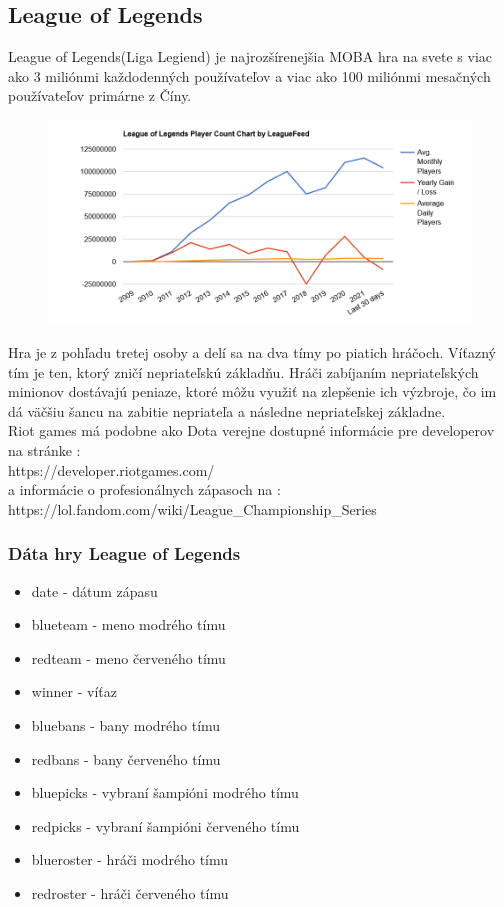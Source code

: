 \subsection{League of Legends}
League of Legends(Liga Legiend) je najrozšírenejšia MOBA hra na svete s viac ako 3 miliónmi každodenných používateľov a viac ako 100 miliónmi mesačných používateľov primárne z Číny. \cite{leaguefeed} 

 \begin{figure}[h!]
	
	\includegraphics[width=.9\textwidth]{figures/leaguegraph}
	\centering
	\caption{   \label{leaguegraph}}
	
\end{figure}

Hra je z pohľadu tretej osoby a delí sa na dva tímy po piatich hráčoch. Víťazný tím je ten, ktorý zničí nepriateľskú základňu. Hráči zabíjaním nepriateľských minionov dostávajú peniaze, ktoré môžu využiť na zlepšenie ich výzbroje, čo im dá väčšiu šancu na zabitie nepriateľa a následne nepriateľskej základne.
\\ 
Riot games má podobne ako Dota verejne dostupné informácie pre developerov na stránke : 
\\ 
https://developer.riotgames.com/  
\\
a informácie o profesionálnych zápasoch na :
\\
https://lol.fandom.com/wiki/League\_Championship\_Series

\subsubsection{Dáta hry League of Legends}
\begin{itemize}
\item date - dátum zápasu 
\item blueteam - meno modrého tímu 
\item redteam - meno červeného tímu 
\item winner - víťaz 
\item bluebans - bany modrého tímu 
\item redbans - bany červeného tímu 
\item bluepicks - vybraní šampióni modrého tímu 
\item redpicks - vybraní šampióni červeného tímu 
\item blueroster - hráči modrého tímu 
\item redroster - hráči červeného tímu 
\end{itemize}
